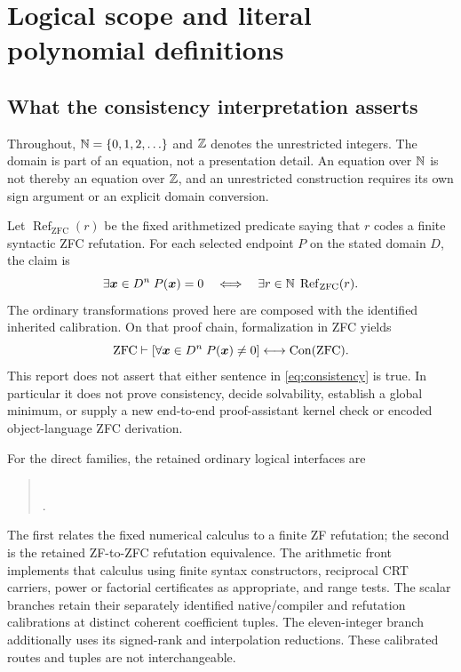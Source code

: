 \section{Logical scope and literal polynomial definitions}
\label{sec:foundation}
\subsection{What the consistency interpretation asserts}
Throughout, $\mathbb N=\{0,1,2,\ldots\}$ and $\mathbb Z$ denotes the unrestricted integers.
The domain is part of an equation, not a presentation detail. An equation over
$\mathbb N$ is not thereby an equation over $\mathbb Z$, and an unrestricted construction
requires its own sign argument or an explicit domain conversion.

Let $\operatorname{Ref}_{\mathrm{ZFC}}(r)$ be the fixed arithmetized predicate
saying that $r$ codes a finite syntactic ZFC refutation. For each selected
endpoint $P$ on the stated domain $D$, the claim is
\begin{equation}\label{eq:calibration}
 \exists\boldsymbol{x}\in D^n\;P(\boldsymbol{x})=0
 \quad\Longleftrightarrow\quad
 \exists r\in\mathbb N\;\operatorname{Ref}_{\mathrm{ZFC}}(r).
\end{equation}
The ordinary transformations proved here are composed with the identified
inherited calibration. On that proof chain, formalization in ZFC yields
\begin{equation}\label{eq:consistency}
 \mathrm{ZFC}\vdash
 \left[\forall\boldsymbol{x}\in D^n\;P(\boldsymbol{x})\ne0\right]
 \longleftrightarrow\operatorname{Con}(\mathrm{ZFC}).
\end{equation}
This report does not assert that either sentence in
\eqref{eq:consistency} is true. In particular it does not prove consistency,
decide solvability, establish a global minimum, or supply a new end-to-end
proof-assistant kernel check or encoded object-language ZFC derivation.

For the direct families, the retained ordinary logical interfaces are
\begin{quote}\small
{}\\
.
\end{quote}
The first relates the fixed numerical calculus to a finite ZF refutation;
the second is the retained ZF-to-ZFC refutation equivalence. The arithmetic
front implements that calculus using finite syntax constructors, reciprocal
CRT carriers, power or factorial certificates as appropriate, and range tests.
The scalar branches retain their separately identified native/compiler and
refutation calibrations at distinct coherent coefficient tuples. The
eleven-integer branch additionally uses its signed-rank and interpolation
reductions. These calibrated routes and tuples are not interchangeable.

